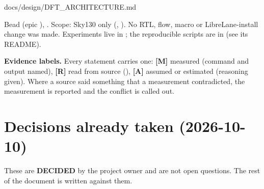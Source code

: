 \begin{relocated}{docs/design/DFT_ARCHITECTURE.md}

Bead  (epic ), . Scope: Sky130 only
(, ). No RTL, flow, macro or
LibreLane-install change was made. Experiments live in
; the reproducible scripts
are in  (see its README).

\textbf{Evidence labels.} Every statement carries one: \textbf{{[}M{]}}
measured (command and output named), \textbf{{[}R{]}} read from source
(), \textbf{{[}A{]}} assumed or estimated (reasoning
given). Where a source said something that a measurement contradicted,
the measurement is reported and the conflict is called out.

\section{Decisions already taken (2026-10-10)}\label{tm:ch:dft-architecture:0-decisions-already-taken-2026-10-10}

These are \textbf{DECIDED} by the project owner and are not open
questions. The rest of the document is written against them.

{\footnotesize\setlength{\tabcolsep}{3pt}

}
\end{relocated}
